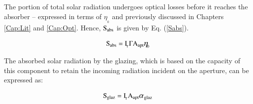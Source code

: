 
%
%
The portion of total solar radiation undergoes optical losses before it reaches the absorber -- expressed in terms of ${\eta_{\!_{0}}}$ and previously discussed in Chapters \ref{Cap:Lit} and \ref{Cap:Opt}. Hence, $\rm{S_{abs}}$ is given by Eq. (\ref{Sabs}).

\vspace{-0.75cm}
\begin{equation}
\mathrm{{S_{abs}} = I_{\!_{T}}\Gamma A_{apt}\mathlarger{{\eta_{\!_{0}}}}}
\label{Sabs}
\end{equation}

The absorbed solar radiation by the glazing, which is based on the capacity of this component to retain the incoming radiation incident on the aperture, can be expressed as:

\vspace{-0.75cm}
\begin{equation}
\mathrm{{S_{glaz}} = I_{\!_{T}}A_{apt}{\mathlarger{\alpha}_{\mathrm{glaz}}}}
\label{Sglaz}
\end{equation}

